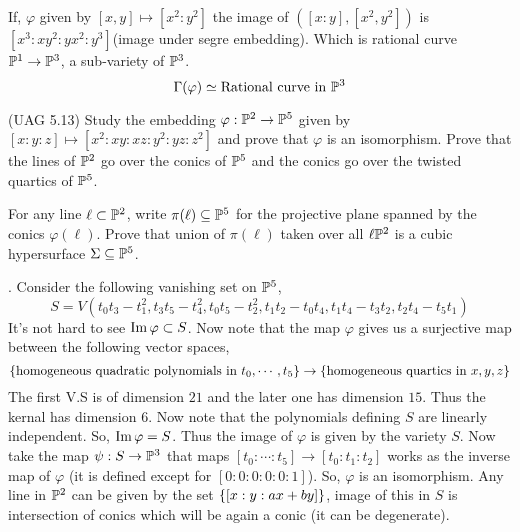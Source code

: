 \documentclass[12pt]{article}
\begin{document}
\vspace*{0.2cm}

\noindent If, $\varphi$ given by $[x,y]\mapsto [x^2:y^2]$ the image of $([x:y],[x^2,y^2])$ is $[x^3:xy^2:yx^2:y^3]$(image under segre embedding). Which is rational curve $\mathbb{P}^1 \to \mathbb{P}^3$, a sub-variety of $\mathbb{P}^3$.
$$\Gamma(\varphi)\simeq \text{Rational curve in }\mathbb{P}^3$$

\begin{prob} %
    (UAG 5.13) Study the embedding $\varphi : \mathbb{P}^2 \to \mathbb{P}^5$ given by $[x:y:z] \mapsto [x^2:xy:xz:y^2:yz:z^2]$ and prove that $\varphi$ is an isomorphism. Prove that the lines of $\mathbb{P}^2$ go over the conics of $\mathbb{P}^5$ and the conics go over the twisted quartics of $\mathbb{P}^5$.

    \vspace*{0.2cm}

    \noindent For any line $\ell \subset \mathbb{P}^2$, write $\pi(\ell) \subseteq \mathbb{P}^5$ for the projective plane spanned by the conics $\varphi(\ell)$. Prove that union of $\pi(\ell)$ taken over all $\ell \mathbb{P}^2$ is a cubic hypersurface $\Sigma \subseteq \mathbb{P}^5$.
\end{prob}

\sol. Consider the following vanishing set on $\mathbb{P}^5$, $$S = V(t_0t_3-t_1^2, t_3t_5-t_4^2,t_0t_5-t_2^2,t_1t_2-t_0t_4,t_1t_4-t_3t_2,t_2t_4-t_5t_1)$$
It's not hard to see $\operatorname{Im} \varphi \subset S$. Now note that the map $\varphi$ gives us a surjective map between the following vector spaces, \[
 \qty{\text{homogeneous quadratic polynomials in }t_0,\cdots,t_5} \to  \qty{\text{homogeneous quartics in } x,y,z}    
\] 
The first V.S is of dimension $21$ and the later one has dimension $15$. Thus the kernal has dimension $6$. Now note that the polynomials defining $S$ are linearly independent. So, $\operatorname{Im} \varphi = S$. Thus the image of $\varphi$ is given by the variety $S$. Now take the map $\psi : S \to \mathbb{P}^3$ that maps $[t_0:\cdots:t_5] \to [t_0:t_1:t_2]$ works as the inverse map of $\varphi$ (it is defined except for $[0:0:0:0:0:1]$). So, $\varphi$ is an isomorphism. Any line in $\mathbb{P}^2$ can be given by the set $\qty{[x:y:ax+by]}$, image of this in $S$ is intersection of conics which will be again a conic (it can be degenerate).
\end{document}
